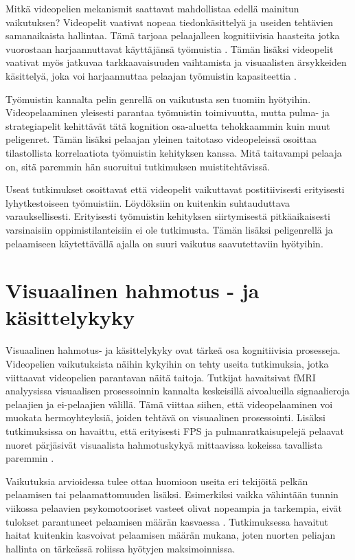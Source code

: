 \documentclass[utf8,bachelor]{gradu3}
\begin{document}
Mitkä videopelien mekanismit saattavat mahdollistaa edellä mainitun vaikutuksen? Videopelit vaativat nopeaa tiedonkäsittelyä ja useiden tehtävien samanaikaista hallintaa. Tämä tarjoaa pelaajalleen kognitiivisia haasteita jotka vuorostaan harjaannuttavat käyttäjänsä työmuistia \parencite{choudhury2022cognitive}. Tämän lisäksi videopelit vaativat myös jatkuvaa tarkkaavaisuuden vaihtamista ja visuaalisten ärsykkeiden käsittelyä, joka voi harjaannuttaa pelaajan työmuistin kapasiteettia \parencite{jamanetworkopen}.  

Työmuistin kannalta pelin genrellä on vaikutusta sen tuomiin hyötyihin. Videopelaaminen yleisesti parantaa työmuistin toimivuutta, mutta pulma- ja strategiapelit kehittävät tätä kognition osa-aluetta tehokkaammin kuin muut peligenret.  Tämän lisäksi pelaajan yleinen taitotaso videopeleissä osoittaa tilastollista korrelaatiota työmuistin kehityksen kanssa. Mitä taitavampi pelaaja on, sitä paremmin hän suoruitui tutkimuksen muistitehtävissä. \parencite {zioga2024validation} 

Useat tutkimukset osoittavat että videopelit vaikuttavat postitiivisesti erityisesti lyhytkestoiseen työmuistiin. Löydöksiin on kuitenkin suhtauduttava varauksellisesti. Erityisesti työmuistin kehityksen siirtymisestä pitkäaikaisesti varsinaisiin oppimistilanteisiin ei ole tutkimusta. Tämän lisäksi peligenrellä ja pelaamiseen käytettävällä ajalla on suuri vaikutus saavutettaviin hyötyihin.   

\section{Visuaalinen hahmotus - ja käsittelykyky}

Visuaalinen hahmotus- ja käsittelykyky ovat tärkeä osa kognitiivisia prosesseja. Videopelien vaikutuksista näihin kykyihin on tehty useita tutkimuksia, jotka viittaavat videopelien parantavan näitä taitoja. Tutkijat \textcite{jamanetworkopen} havaitsivat fMRI analyysissa visuaalisen prosessoinnin kannalta keskeisillä aivoalueilla signaalieroja pelaajien ja ei-pelaajien välillä. Tämä viittaa siihen, että videopelaaminen voi muokata hermoyhteyksiä, joiden tehtävä on visuaalinen prosessointi. Lisäksi tutkimuksissa on havaittu, että erityisesti FPS ja pulmanratkaisupelejä pelaavat nuoret pärjäsivät visuaalista hahmotuskykyä mittaavissa kokeissa tavallista paremmin \parencite{zioga2024validation}.  

Vaikutuksia arvioidessa tulee ottaa huomioon useita eri tekijöitä pelkän pelaamisen tai pelaamattomuuden lisäksi. Esimerkiksi vaikka vähintään tunnin viikossa pelaavien psykomotooriset vasteet olivat nopeampia ja tarkempia, eivät tulokset parantuneet pelaamisen määrän kasvaessa \parencite{pujol2016video}. Tutkimuksessa havaitut haitat kuitenkin kasvoivat pelaamisen määrän mukana, joten nuorten peliajan hallinta on tärkeässä roliissa hyötyjen maksimoinnissa. 
\end{document}
